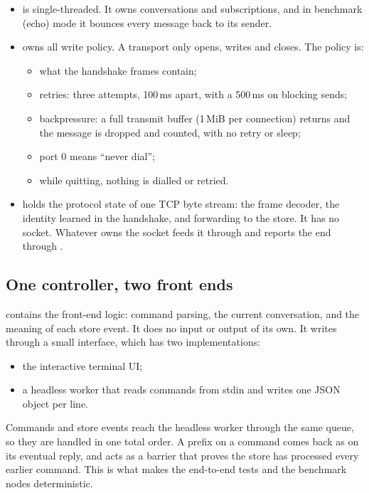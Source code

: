 \begin{itemize}
  \item \textbf{} is single-threaded. It owns conversations and
        subscriptions, and in benchmark (echo) mode it bounces every message back
        to its sender.
  \item \textbf{} owns all write policy. A transport only opens,
        writes and closes. The policy is:
        \begin{itemize}
          \item what the handshake frames contain;
          \item retries: three attempts, 100\,ms apart, with a 500\,ms
                 on blocking sends;
          \item backpressure: a full transmit buffer (1\,MiB per connection) returns
                 and the message is dropped and counted, with no
                retry or sleep;
          \item port 0 means ``never dial'';
          \item while quitting, nothing is dialled or retried.
        \end{itemize}
  \item \textbf{} holds the protocol state of one TCP byte stream:
        the frame decoder, the identity learned in the handshake, and forwarding to
        the store. It has no socket. Whatever owns the socket feeds it through
         and reports the end through .
\end{itemize}

\subsection{One controller, two front ends}

 contains the front-end logic: command parsing, the current
conversation, and the meaning of each store event. It does no input or output of its
own. It writes through a small  interface, which has two
implementations:
\begin{itemize}
  \item the interactive terminal UI;
  \item a headless worker that reads commands from stdin and writes one JSON object
        per line.
\end{itemize}
Commands and store events reach the headless worker through the same queue, so they
are handled in one total order. A  prefix on a command comes back as
 on its eventual reply, and  acts as a barrier that proves the
store has processed every earlier command. This is what makes the end-to-end tests
and the benchmark nodes deterministic.


